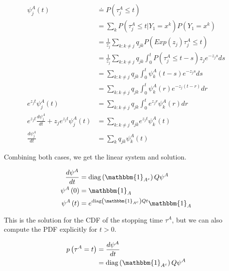 \begin{align}
\psi_j^A\left(t\right) &\doteq P\left(\tau^A_j \leq t\right) \\
                       &= \sum_k P\left(\tau^A_j \leq t | Y_1 = x^k\right) P\left(Y_1 = x^k\right) \\ 
                       &= \frac{1}{z_j}\sum_{k: k \neq j} q_{jk} P\left(Exp\left(z_j\right)\tau^A_j \leq t\right)  \\
                       &= \frac{1}{z_j}\sum_{k: k \neq j} q_{jk} \int^t_0 P\left(\tau^A_j \leq t - s\right) z_j e^{-z_j s} ds  \\
                       &= \sum_{k: k \neq j} q_{jk} \int^t_0\psi^A_k\left(t-s\right)e^{-z_j s} ds  \\
                       &= \sum_{k: k \neq j} q_{jk} \int^t_0\psi^A_k\left(r\right)e^{-z_j\left(t-r\right)} dr  \\
e^{z_jt}\psi^A_j\left(t\right) &= \sum_{k: k \neq j} q_{jk} \int^t_0 e^{z_jr}\psi^A_k\left(r\right) dr  \\
e^{z_jt}\frac{d\psi^A_j}{dt} + z_j e^{z_j t} \psi^A_j\left(t\right) &= \sum_{k: k \neq j} q_{jk} e^{z_jt}\psi^A_k\left(t\right)  \\
\frac{d\psi^A_j}{dt} &= \sum_{k} q_{jk} \psi^A_k\left(t\right) 
\end{align}

Combining both cases, we get the linear system and solution.

\begin{align}
        \frac{d\psi^A}{dt} &= \diag\left(\mathbbm{1}_{A^c}\right)Q\psi^A \\
        \psi^A\left(0\right) &= \mathbbm{1}_{A} \\
        \psi^A\left(t\right) &= e^{\diag\left(\mathbbm{1}_{A^c}\right)Qt} \mathbbm{1}_{A} \\ 
\end{align}

This is the solution for the CDF of the stopping time $\tau^A$, but we can also compute the PDF explicitly for $t > 0$.

\begin{align}
        p\left(\tau^A = t\right) &= \frac{d\psi^A}{dt} \\
        &= \diag\left(\mathbbm{1}_{A^c}\right)Q\psi^A
\end{align} 


